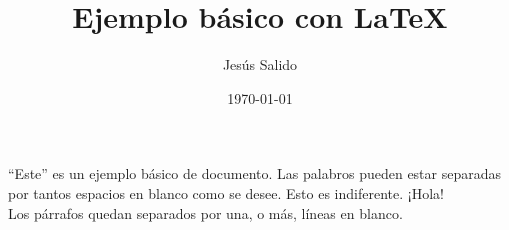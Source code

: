 \documentclass[11pt,a4paper]{article}
\title{Ejemplo básico con \LaTeX}
\author{Jesús Salido}
\date{\today}
\begin{document}
\maketitle


\noindent “Este” es un ejemplo básico de documento. Las     palabros        pueden estar       separadas por tantos         espacios     en blanco   como se desee. Esto es indiferente. ¡Hola!\\[5cm]





           Los párrafos quedan separados por una, o más, líneas en blanco.
           
           
           
\end{document}
